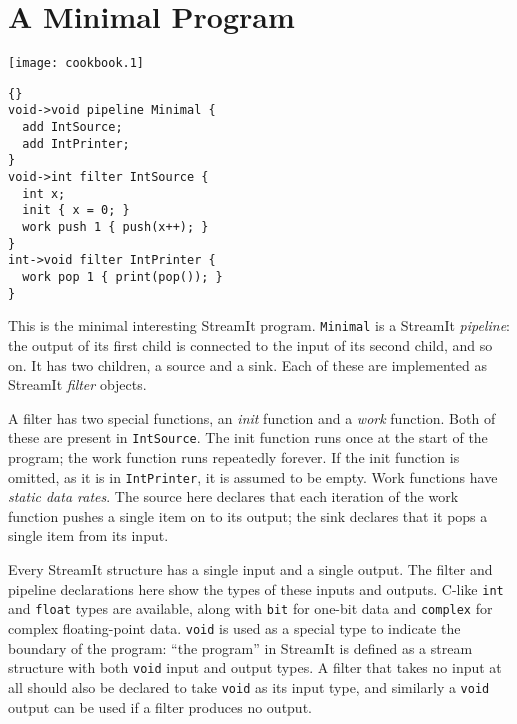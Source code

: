 \section{A Minimal Program}

\begin{textpic}{\texttt{[image: cookbook.1]}}
\begin{lstlisting}{}
void->void pipeline Minimal {
  add IntSource;
  add IntPrinter;
}
void->int filter IntSource {
  int x;
  init { x = 0; }
  work push 1 { push(x++); }
}
int->void filter IntPrinter {
  work pop 1 { print(pop()); }
}
\end{lstlisting}
\end{textpic}

This is the minimal interesting StreamIt program.  \lstinline|Minimal|
is a StreamIt \emph{pipeline}: the output of its first child is
connected to the input of its second child, and so on.  It has two
children, a source and a sink.  Each of these are implemented as
StreamIt \emph{filter} objects.

A filter has two special functions, an \emph{init} function and a
\emph{work} function.  Both of these are present in
\lstinline|IntSource|.  The init function runs once at the start of
the program; the work function runs repeatedly forever.  If the init
function is omitted, as it is in \lstinline|IntPrinter|, it is assumed
to be empty.  Work functions have \emph{static data rates}.  The
source here declares that each iteration of the work function pushes a
single item on to its output; the sink declares that it pops a single
item from its input.

Every StreamIt structure has a single input and a single output.  The
filter and pipeline declarations here show the types of these inputs
and outputs.  C-like \lstinline|int| and \lstinline|float| types are
available, along with \lstinline|bit| for one-bit data and
\lstinline|complex| for complex floating-point data.  \lstinline|void|
is used as a special type to indicate the boundary of the program:
``the program'' in StreamIt is defined as a stream structure with both
\lstinline|void| input and output types.  A filter that takes no input
at all should also be declared to take \lstinline|void| as its input
type, and similarly a \lstinline|void| output can be used if a filter
produces no output.

